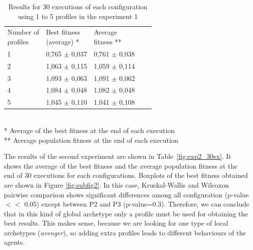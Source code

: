 \documentclass[letterpaper]{article}
\begin{document}
\begin{table}
\begin{center}
\caption{Results for 30 executions of each configuration using 1 to 5 profiles in the experiment 1}
\label{fig:exp1_30ex}

\begin{tabular}{lllll}
\hline\noalign{\smallskip}
\parbox[t]{1.5cm}{Number of\\ profiles}
& \parbox[t]{2cm}{Best fitness\\ (average) *}
& \parbox[t]{2cm}{Average\\ fitness **} \\
\noalign{\smallskip}
\hline
\noalign{\smallskip}
1 & 0,765 $\pm$ 0,037 & 0,761 $\pm$ 0,038 \\
2 & 1,063 $\pm$ 0,115 & 1,059 $\pm$ 0,114 \\
3 & 1,093 $\pm$ 0,063 & 1,091 $\pm$ 0,062 \\
4 & 1,084 $\pm$ 0,048 & 1,082 $\pm$ 0,048 \\
5 & 1,045 $\pm$ 0,110 & 1,041 $\pm$ 0,108 \\
\hline
\end{tabular}
\\
\** Average of the best fitness at the end of each execution\\
\*** Average population fitness  at the end of each execution \\
\end{center}
\end{table}



The results of the second experiment are shown in
Table~\ref{fig:exp2_30ex}. It shows the average of the best fitness
and the average population fitness at the end of 30 executions for
each configurations. Boxplots of the best fitness obtained are shown
in Figure \ref{fig:subfig2}. In this case, Kruskal-Wallis and Wilcoxon
pairwise comparison shows significant differences among all
configuration (p-value $<<$ 0.05) except between P2 and P3
(p-value=0.3). Therefore, we can conclude that in this kind of global
archetype only a profile must be used for obtaining the best
results. This makes sense, because we are looking for one type of
local archetypes ({\em avenger}), so adding extra profiles leads to
different behaviours of the agents. 
\end{document}
